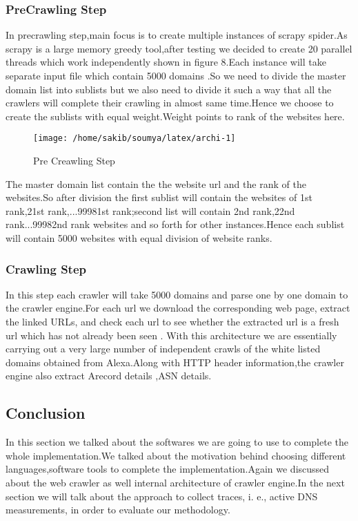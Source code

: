  \subsubsection{PreCrawling Step}
In precrawling step,main focus is to create multiple instances of scrapy spider.As scrapy is a large memory greedy tool,after testing we decided to create 20 parallel threads which work independently shown in figure 8.Each instance will take separate input file which contain 5000 domains .So we need to divide the master domain list into sublists but we also need to divide it such a way that all the crawlers will complete their crawling in almost same time.Hence we choose to create the sublists with equal weight.Weight points to rank of the websites here.

\begin{figure}[h]
\texttt{[image: /home/sakib/soumya/latex/archi-1]}
\centering
\caption{Pre Creawling Step}
\end{figure}

The master domain list contain the the website url and the rank of the websites.So after division the first sublist will contain the websites of 1st rank,21st rank,...99981st rank;second list will contain 2nd rank,22nd rank...99982nd rank websites and so forth for other instances.Hence each sublist will contain 5000 websites with equal division of website ranks. 

\subsubsection{Crawling Step}
In this step each crawler will take 5000 domains and parse one by one domain to the crawler engine.For each url we download the corresponding web page, extract the linked URLs, and check each url to see whether the extracted url is a fresh url which has not already been seen . With this architecture we are essentially carrying out a very large number of independent crawls of the white listed domains obtained from Alexa.Along with HTTP header information,the crawler engine also extract Arecord details ,ASN details.

\subsection{Conclusion}
In this section we talked about the softwares we are going to use to complete the whole implementation.We talked about the motivation behind choosing different languages,software tools to complete the implementation.Again we discussed about the web crawler as well internal architecture of crawler engine.In the next section we will talk about the approach to collect traces, i. e., active DNS measurements, in order to evaluate our methodology.
